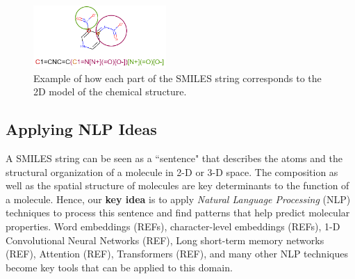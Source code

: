     
    \begin{figure}[h]
        \centering
        \includegraphics[width=0.45\textwidth]{figures/Smiles-Smile3.png}
        \caption{Example of how each part of the SMILES string corresponds to the 2D model of the chemical structure.}
        \label{fig:smile-examples2}
    \end{figure}
\subsection{Applying NLP Ideas}
A SMILES string can be seen as a ``sentence" that describes the atoms and the structural organization of a molecule in 2-D or 3-D space. The composition as well as the spatial structure of molecules are key determinants to the function of a molecule. Hence, our {\bf key idea} is to apply {\em Natural Language Processing} (NLP) techniques to process this sentence and find patterns that help predict molecular properties. Word embeddings (REFs), character-level embeddings (REFs), 1-D Convolutional Neural Networks (REF), Long short-term memory networks (REF), Attention (REF), Transformers (REF), and many other NLP techniques become key tools that can be applied to this domain. 
